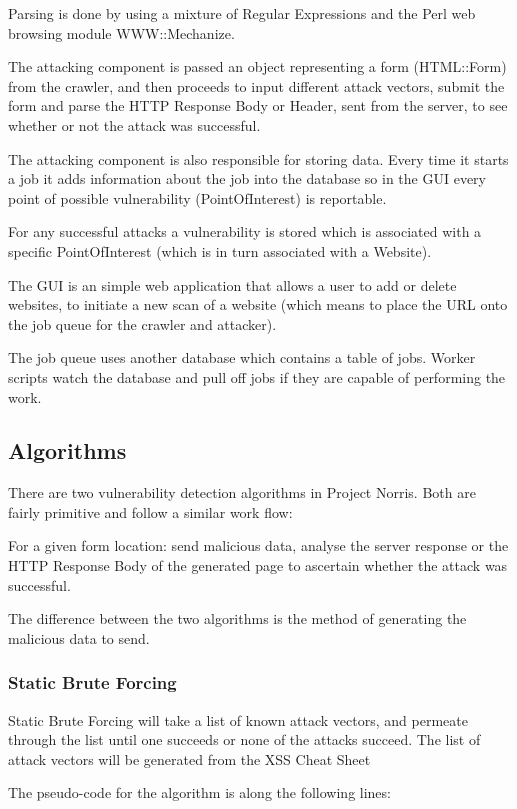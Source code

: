 \documentclass[12pt,a4paper]{article}
\begin{document}
Parsing is done by using a mixture of Regular Expressions and the Perl web browsing module WWW::Mechanize.

The attacking component is passed an object representing a form (HTML::Form) from the crawler, and then proceeds to input different attack vectors, submit the form and parse the HTTP Response Body or Header, sent from the server, to see whether or not the attack was successful.

The attacking component is also responsible for storing data.  Every time it starts a job it adds information about the job into the database so in the GUI every point of possible vulnerability (PointOfInterest) is reportable. 

For any successful attacks a vulnerability is stored which is associated with a specific PointOfInterest (which is in turn associated with a Website).

The GUI is an simple web application that allows a user to add or delete websites, to initiate a new scan of a website (which means to place the URL onto the job queue for the crawler and attacker).

The job queue uses another database which contains a table of jobs.  Worker scripts watch the database and pull off jobs if they are capable of performing the work.

\subsection{Algorithms}
There are two vulnerability detection algorithms in Project Norris.  Both are fairly primitive and follow a similar work flow:

For a given form location: send malicious data, analyse the server response or the HTTP Response Body of the generated page to ascertain whether the attack was successful.

The difference between the two algorithms is the method of generating the malicious data to send.

\subsubsection{Static Brute Forcing}
Static Brute Forcing will take a list of known attack vectors, and permeate through the list until one succeeds or none of the attacks succeed.  The list of attack vectors will be generated from the XSS Cheat Sheet 

The pseudo-code for the algorithm is along the following lines:
\end{document}
